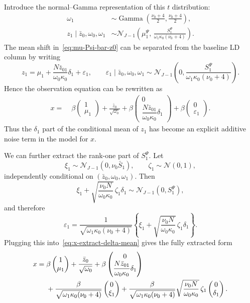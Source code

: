 \documentclass[11pt]{article}
\newcommand{\Gam}{\operatorname{Gamma}}
\newcommand{\Normal}{\mathcal N}
\begin{document}
Introduce the normal--Gamma representation of this $t$ distribution:
\begin{align}
\omega_1
&\sim
\Gam\left(\frac{\nu_0+4}{2},\frac{\nu_0+4}{2}\right),
\label{eq:omega1-gamma}\\
z_1\mid \bar z_0,\omega_0,\omega_1
&\sim
\Normal_{J-1}\left(
\mu_1^\Psi,\,
\frac{S_1^\Psi}{\omega_1\kappa_0(\nu_0+4)}
\right).
\label{eq:z1-normal-gamma-bar-z0}
\end{align}
The mean shift in~\eqref{eq:mu-Psi-bar-z0} can be separated from the baseline
LD column by writing
\[
z_1
=
\mu_1
+\frac{N\bar z_{01}}{\omega_0\kappa_0}\delta_1
+\varepsilon_1,
\qquad
\varepsilon_1\mid \bar z_0,\omega_0,\omega_1
\sim
\Normal_{J-1}\left(
0,\frac{S_1^\Psi}{\omega_1\kappa_0(\nu_0+4)}
\right).
\]
Hence the observation equation can be rewritten as
\begin{align}
x
=\;&
\beta
\begin{pmatrix}
1\\ \mu_1
\end{pmatrix}
+\frac{\bar z_0}{\sqrt{\omega_0}}
+\beta
\begin{pmatrix}
0\\
\dfrac{N\bar z_{01}}{\omega_0\kappa_0}\delta_1
\end{pmatrix}
+\beta
\begin{pmatrix}
0\\ \varepsilon_1
\end{pmatrix}.
\label{eq:x-extract-delta-mean}
\end{align}
Thus the $\delta_1$ part of the conditional mean of $z_1$ has become an
explicit additive noise term in the model for $x$.

We can further extract the rank-one part of $S_1^\Psi$. Let
\[
\xi_1\sim\Normal_{J-1}(0,\nu_0\bar S_1),
\qquad
\zeta_1\sim\Normal(0,1),
\]
independently conditional on $(\bar z_0,\omega_0,\omega_1)$. Then
\[
\xi_1+
\sqrt{\frac{\nu_0 N}{\omega_0\kappa_0}}\,
\zeta_1\delta_1
\sim
\Normal_{J-1}(0,S_1^\Psi),
\]
and therefore
\[
\varepsilon_1
=
\frac{1}{\sqrt{\omega_1\kappa_0(\nu_0+4)}}
\left\{
\xi_1+
\sqrt{\frac{\nu_0 N}{\omega_0\kappa_0}}\,
\zeta_1\delta_1
\right\}.
\]
Plugging this into~\eqref{eq:x-extract-delta-mean} gives the fully extracted
form
\begin{align}
x
=\;&
\beta
\begin{pmatrix}
1\\ \mu_1
\end{pmatrix}
+\frac{\bar z_0}{\sqrt{\omega_0}}
+\beta
\begin{pmatrix}
0\\
\dfrac{N\bar z_{01}}{\omega_0\kappa_0}\delta_1
\end{pmatrix}
\notag\\
&+
\frac{\beta}{\sqrt{\omega_1\kappa_0(\nu_0+4)}}
\begin{pmatrix}
0\\ \xi_1
\end{pmatrix}
+\frac{\beta}{\sqrt{\omega_1\kappa_0(\nu_0+4)}}
\sqrt{\frac{\nu_0 N}{\omega_0\kappa_0}}\,
\zeta_1
\begin{pmatrix}
0\\ \delta_1
\end{pmatrix}.
\label{eq:x-fully-extracted}
\end{align}
\end{document}
